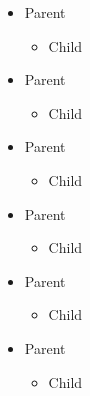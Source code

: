\begin{itemize}
\item Parent
\begin{itemize}
\item Child
\end{itemize}
\end{itemize}
\begin{itemize}
\item Parent
\begin{itemize}
\item Child
\end{itemize}
\end{itemize}
\begin{itemize}
\item Parent
\begin{itemize}
\item Child
\end{itemize}
\end{itemize}
\begin{frame}[t]
\begin{itemize}
\item Parent
\begin{itemize}
\item Child
\end{itemize}
\end{itemize}
\end{frame}

\begin{frame}[t]
\begin{itemize}
\item Parent
\begin{itemize}
\item Child
\end{itemize}
\end{itemize}
\end{frame}

\begin{frame}[t]
\begin{itemize}
\item Parent
\begin{itemize}
\item Child
\end{itemize}
\end{itemize}
\end{frame}

